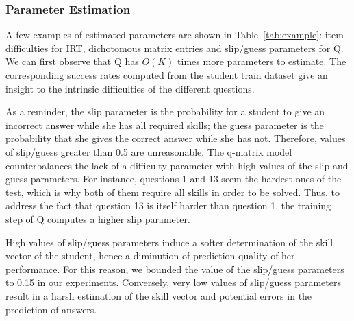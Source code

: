\documentclass{edm_template}
\begin{document}
\subsubsection{Parameter Estimation}

A few examples of estimated parameters are shown in Table~\ref{tab:example}: item difficulties for IRT, dichotomous matrix entries and slip/guess parameters for Q. We can first observe that Q has $O(K)$ times more parameters to estimate. The corresponding success rates computed from the student train dataset give an insight to the intrinsic difficulties of the different questions.

As a reminder, the slip parameter is the probability for a student to give an incorrect answer while she has all required skills; the guess parameter is the probability that she gives the correct answer while she has not. Therefore, values of slip/guess greater than 0.5 are unreasonable. The q-matrix model counterbalances the lack of a difficulty parameter with high values of the slip and guess parameters. For instance, questions 1 and 13 seem the hardest ones of the test, which is why both of them require all skills in order to be solved. Thus, to address the fact that question 13 is itself harder than question 1, the training step of Q computes a higher slip parameter.

High values of slip/guess parameters induce a softer determination of the skill vector of the student, hence a diminution of prediction quality of her performance. For this reason, we bounded the value of the slip/guess parameters to 0.15 in our experiments. Conversely, very low values of slip/guess parameters result in a harsh estimation of the skill vector and potential errors in the prediction of answers.
\end{document}
